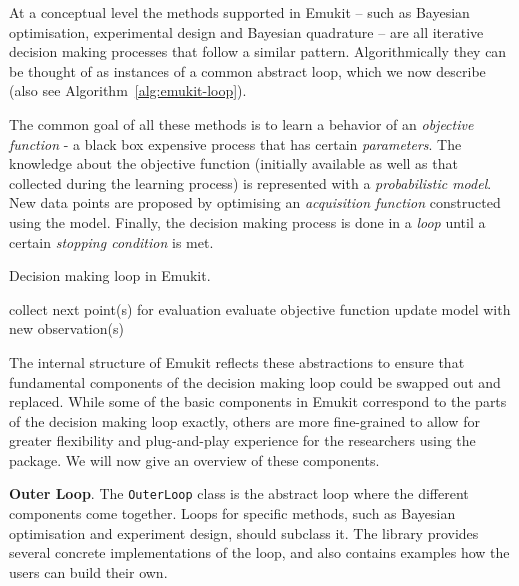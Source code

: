 At a conceptual level the methods supported in Emukit -- such as Bayesian optimisation, experimental design and Bayesian quadrature -- are all iterative decision making processes that follow a similar pattern. Algorithmically they can be thought of as instances of a common abstract loop, which we now describe (also see Algorithm~\ref{alg:emukit-loop}).

The common goal of all these methods is to learn a behavior of an \textit{objective function} - a black box expensive process that has certain \textit{parameters}. The knowledge about the objective function (initially available as well as that collected during the learning process) is represented with a \textit{probabilistic model}. New data points are proposed by optimising an \textit{acquisition function} constructed using the model.   Finally, the decision making process is done in a \textit{loop} until a certain \textit{stopping condition} is met. 

\begin{algorithm}[H]
  \caption{Decision making loop in Emukit.}
  \label{alg:emukit-loop}
  \begin{algorithmic}[1]
      \State collect next point(s) for evaluation
      \State evaluate objective function
      \State update model with new observation(s)
    \EndWhile
  \end{algorithmic}
\end{algorithm}

The internal structure of Emukit reflects these abstractions to ensure that fundamental components of the decision making loop could be swapped out and replaced. While some of the basic components in Emukit correspond to the parts of the decision making loop exactly, others are more fine-grained to allow for greater flexibility and plug-and-play experience for the researchers using the package. We will now give an overview of these components.

\textbf{Outer Loop}. The \texttt{OuterLoop} class is the abstract loop where the different components come together. Loops for specific methods, such as Bayesian optimisation and experiment design, should subclass it. The library provides several concrete implementations of the loop, and also contains examples how the users can build their own.

